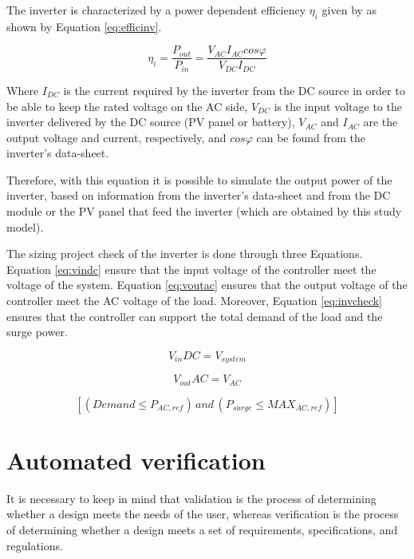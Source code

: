 \documentclass[journal]{IEEEtran}
\begin{document}
The inverter is characterized by a power dependent efficiency $ \eta_{i} $ given by \cite{Hansen} as shown by Equation \ref{eq:efficinv}.

\begin{equation}
\label{eq:efficinv}
\eta_{i} = \dfrac{P_{out}}{P_{in}} = \dfrac{V_{AC} I_{AC} cos\varphi}{V_{DC}I_{DC}}
\end{equation}

Where $ I_{DC} $ is the current required by the inverter from the DC source in order to be able to keep the rated voltage on the AC side, $ V_{DC} $ is the input voltage to the inverter delivered by the DC source (PV panel or battery),  $ V_{AC}  $ and $ I_{AC} $ are the output voltage and current, respectively, and $ cos \varphi $ can be found from the inverter's data-sheet.

Therefore, with this equation it is possible to simulate the output power of the inverter, based on information from the inverter's data-sheet and from the DC module or the PV panel that feed the inverter (which are obtained by this study model). 

The sizing project check of the inverter is done through three Equations. Equation \ref{eq:vindc} ensure that the input voltage of the controller meet the voltage of the system. Equation \ref{eq:voutac} ensures that the output voltage of the controller meet the AC voltage of the load. Moreover, Equation \ref{eq:invcheck} ensures that the controller can support the total demand of the load and the surge power.

\begin{equation}
\label{eq:vindc} 
V_{in}DC = V_{system}
\end{equation}

\begin{equation}
\label{eq:voutac} 
V_{out}AC = V_{AC}
\end{equation}

\begin{equation}
\label{eq:invcheck} 
\left[ (Demand \leq P_{AC,ref}) \, and \, (P_{surge} \leq MAX_{AC,ref}) \right] 
\end{equation}


\section{Automated verification }
It is necessary to keep in mind that validation is the process of determining whether a design meets the needs of the user, whereas verification is the process of determining whether a design meets a set of requirements, specifications, and regulations.  
\end{document}
